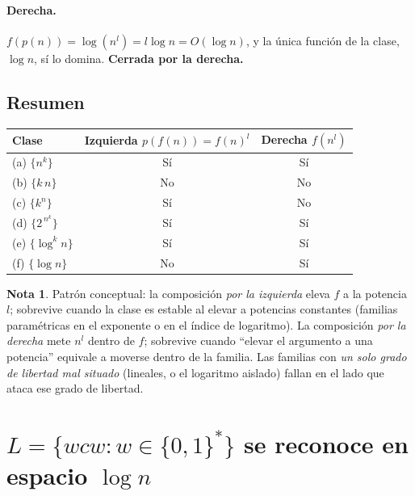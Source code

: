 \documentclass[11pt,a4paper]{article}
\theoremstyle{plain}
\theoremstyle{definition}
\newtheorem*{nota}{Nota}
\begin{document}
\paragraph{Derecha.} $f(p(n)) = \log(n^{l}) = l\log n = O(\log n)$, y la \'unica
funci\'on de la clase, $\log n$, s\'i lo domina. \textbf{Cerrada por la derecha.}

\medskip\noindent{}

\subsection*{Resumen}

\begin{center}
\renewcommand{\arraystretch}{1.35}
\begin{tabular}{|l|c|c|}
\hline
\textbf{Clase} & \textbf{Izquierda} $p(f(n))=f(n)^{l}$ & \textbf{Derecha} $f(n^{l})$\\
\hline
(a) $\{n^{k}\}$        & S\'i & S\'i \\
(b) $\{k\,n\}$         & No   & No   \\
(c) $\{k^{n}\}$        & S\'i & No   \\
(d) $\{2^{\,n^{k}}\}$  & S\'i & S\'i \\
(e) $\{\log^{k} n\}$   & S\'i & S\'i \\
(f) $\{\log n\}$       & No   & S\'i \\
\hline
\end{tabular}
\end{center}

\begin{nota}
Patr\'on conceptual: la composici\'on \emph{por la izquierda} eleva $f$ a la
potencia $l$; sobrevive cuando la clase es estable al elevar a potencias
constantes (familias param\'etricas en el exponente o en el \'indice de
logaritmo). La composici\'on \emph{por la derecha} mete $n^{l}$ dentro de $f$;
sobrevive cuando ``elevar el argumento a una potencia'' equivale a moverse dentro de
la familia. Las familias con \emph{un solo grado de libertad mal situado} (lineales,
o el logaritmo aislado) fallan en el lado que ataca ese grado de libertad.
\end{nota}

\section{$L=\{wcw : w\in\{0,1\}^{*}\}$ se reconoce en espacio $\log n$}
\end{document}
